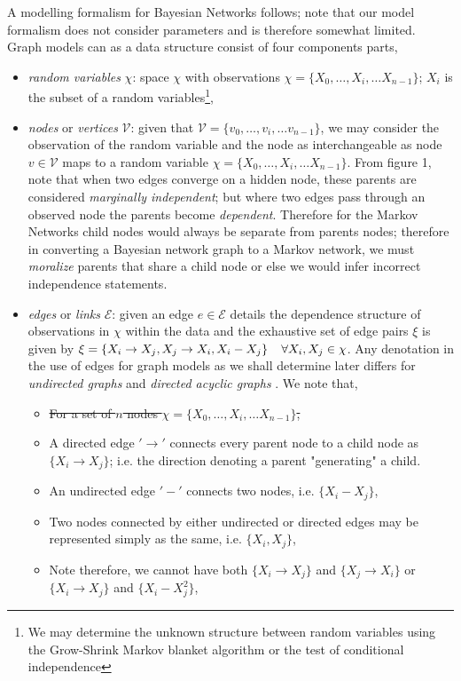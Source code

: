 \documentclass[7pt]{article}
\begin{document}
 A modelling formalism for Bayesian Networks follows; note that our model formalism does not consider parameters and is therefore somewhat limited.  Graph models can as a data structure consist of four components parts, 
\begin{itemize}
	\item \emph{random variables} $\chi$:  space $\chi$ with observations $\chi = \{X_0,…,X_i, … X_{n-1}\}$; $X_i$ is the subset of a random variables\footnote{We may determine the unknown structure between random variables using the Grow-Shrink Markov blanket algorithm or the test of conditional independence},
	\item \emph{nodes} or \emph{vertices} $\mathcal{V}$: given that $\mathcal{V}= \{v_0,…,v_i, … v_{n-1}\}$, we may consider the observation of the random variable and the node as interchangeable as {node} $v \in \mathcal{V}$ maps to a random variable  $\chi = \{X_0,…,X_i, … X_{n-1}\}$. From figure 1, note that when two edges converge on a hidden node, these parents are considered  \emph{marginally independent}; but where two edges pass through an observed node the parents become \emph{dependent}. Therefore for the Markov Networks child nodes would always be separate from  parents nodes; therefore in converting a Bayesian network graph to a Markov network, we must \emph{moralize} parents that share a child node or else we would infer incorrect independence statements.
	\item \emph{edges} or \emph{links} $\mathcal{E}$: given an edge $e \in \mathcal{E}$ details the dependence structure of observations in $\chi$ within the data and the exhaustive set of edge pairs $\xi$ is given by $\xi =\{X_i \rightarrow X_j, X_j \rightarrow X_i, X_i - X_j \} \hspace{0.15in} \forall X_i, X_j \in \chi$. Any denotation in the use of edges for graph models as we shall determine later differs for \emph{undirected graphs} and \emph{directed acyclic graphs} \cite{bang2008digraphs,diestel2017extremal}.  We note that,
	\begin{itemize}
		\item \st{For a set of $n$ nodes $\chi = \{X_0,…,X_i, … X_{n-1}\}$,}
		\item A directed edge $'\rightarrow'$ connects every parent node to a child node as $\{X_i \rightarrow X_j\}$; i.e. the direction denoting a parent "generating" a child. 
		\item An undirected edge $'-'$ connects two nodes, i.e. $\{X_i - X_j\}$,
		\item Two nodes connected by either undirected or directed edges  may be represented simply as the same, i.e.  $\{X_i , X_j \}$,
		\item Note therefore, we cannot have both $\{X_i \rightarrow X_j\}$ and $\{X_j \rightarrow X_i\}$ or $\{X_i \rightarrow X_j\}$ and $\{X_i - X_j^2\}$,
		

\end{itemize}
\end{itemize}
\end{document}
